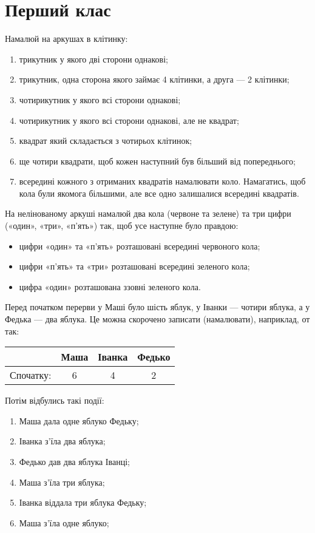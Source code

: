 \chapter{Перший клас}


\problem
Намалюй на аркушах в клітинку:
\begin{enumerate}
    \item трикутник у якого дві сторони однакові;
    \item трикутник, одна сторона якого займає 4 клітинки, а друга --- 2 клітинки;
    \item чотирикутник у якого всі сторони однакові;
    \item чотирикутник у якого всі сторони однакові, але не квадрат;
    \item квадрат який складається з чотирьох клітинок;
    \item ще чотири квадрати, щоб кожен наступний був більший від попереднього;
    \item всередині кожного з отриманих квадратів намалювати коло.
    Намагатись, щоб кола були якомога більшими,
    але все одно залишалися всередині квадратів.
\end{enumerate}


\problem
На нелінованому аркуші намалюй два кола (червоне та зелене)
та три цифри («один», «три», «п'ять») так,
щоб усе наступне було правдою:
\begin{itemize}
    \item цифри «один» та «п'ять» розташовані всередині червоного кола;
    \item цифри «п'ять» та «три» розташовані всередині зеленого кола;
    \item цифра «один» розташована ззовні зеленого кола.
\end{itemize}


\problem
Перед початком перерви у Маші було шість яблук,
у Іванки --- чотири яблука, а у Федька --- два яблука.
Це можна скорочено записати (намалювати), наприклад, от так:

\medskip

\begin{tabular}{|r|c|c|c|}
\hline
& Маша & Іванка & Федько \\
\hline
Спочатку: & 6 & 4 & 2 \\
\hline
\end{tabular}

\medskip

Потім відбулись такі події:
\begin{enumerate}
    \item Маша дала одне яблуко Федьку;
    \item Іванка з'їла два яблука;
    \item Федько дав два яблука Іванці;
    \item Маша з'їла три яблука;
    \item Іванка віддала три яблука Федьку;
    \item Маша з'їла одне яблуко;
\end{enumerate}

